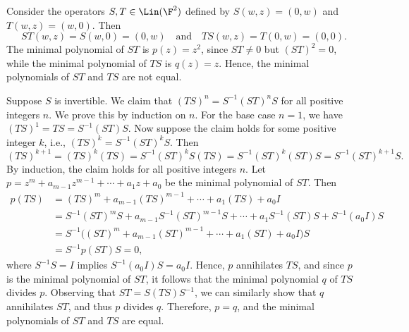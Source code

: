 \begin{solution}\leavevmode
\begin{parts}
\item Consider the operators $S,T\in\Lin(\F^2)$ defined by $S(w,z)=(0,w)$ and
  $T(w,z)=(w,0)$. Then
  \[ ST(w,z)=S(w,0)=(0,w) \quad\text{and}\quad TS(w,z)=T(0,w)=(0,0). \]
  The minimal polynomial of $ST$ is $p(z)=z^2$, since $ST\ne0$ but
  $(ST)^2=0$, while the minimal polynomial of $TS$ is $q(z)=z$. Hence, the
  minimal polynomials of $ST$ and $TS$ are not equal.
\item Suppose $S$ is invertible. We claim that $(TS)^n=S^{-1}(ST)^nS$ for all
  positive integers $n$. We prove this by induction on $n$. For the base case
  $n=1$, we have $(TS)^1=TS=S^{-1}(ST)S$. Now suppose the claim holds for some
  positive integer $k$, i.e., $(TS)^k=S^{-1}(ST)^kS$. Then
  \[ (TS)^{k+1}=(TS)^k(TS)=S^{-1}(ST)^kS(TS)=S^{-1}(ST)^k(ST)S
     =S^{-1}(ST)^{k+1}S. \]
  By induction, the claim holds for all positive integers $n$. Let
  $p=z^m+a_{m-1}z^{m-1}+\cdots+a_1z+a_0$ be the minimal polynomial of $ST$.
  Then
  \begin{align*}
  p(TS) &= (TS)^m+a_{m-1}(TS)^{m-1}+\cdots+a_1(TS)+a_0I\\
        &= S^{-1}(ST)^mS+a_{m-1}S^{-1}(ST)^{m-1}S+\cdots+a_1S^{-1}(ST)S
           +S^{-1}(a_0I)S\\
        &= S^{-1}\bigl((ST)^m+a_{m-1}(ST)^{m-1}+\cdots+a_1(ST)+a_0I\bigr)S\\
        &= S^{-1}p(ST)S=0,
  \end{align*}
  where $S^{-1}S=I$ implies $S^{-1}(a_0I)S=a_0I$. Hence, $p$ annihilates $TS$,
  and since $p$ is the minimal polynomial of $ST$, it follows that the minimal
  polynomial $q$ of $TS$ divides $p$. Observing that $ST=S(TS)S^{-1}$, we can
  similarly show that $q$ annihilates $ST$, and thus $p$ divides $q$.
  Therefore, $p=q$, and the minimal polynomials of $ST$ and $TS$ are equal.
  \qedhere
\end{parts}
\end{solution}

